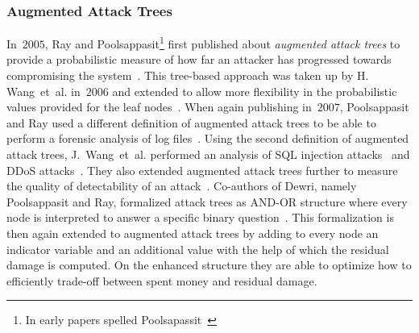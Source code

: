 \documentclass[a4paper]{article}
\begin{document}
\subsubsection{Augmented Attack Trees} 
\label{sec:augmented_attack_trees}

In~$2005$, Ray and Poolsappasit\footnote{In early papers spelled
Poolsapassit~\cite{RaPo,PoRa}} first published about \emph{augmented
attack trees} to provide a probabilistic measure of how far an
attacker has progressed towards compromising the system~\cite{RaPo}. This
tree-based approach was taken up by H. Wang~et~al. in~$2006$ and extended to
allow more flexibility in the probabilistic values provided for the leaf
nodes~\cite{WaLiZh}. When again publishing in~$2007$, Poolsappasit and Ray used
a different definition of augmented attack trees to be able to perform a
forensic analysis of log files~\cite{PoRa}. Using the second definition of
augmented attack trees, J.~Wang~et~al. performed an analysis of SQL injection
attacks~\cite{WaPhWhPa} and DDoS attacks~\cite{WaPhWhPa3}. They also extended
augmented attack trees further to measure the quality of detectability of an
attack~\cite{WaPhWhPa2}. Co-authors of Dewri, namely Poolsappasit and Ray,
formalized attack trees as AND-OR structure where every node is interpreted to
answer a specific binary question~\cite{DePoRaWh,DeRaPoWh}. This
formalization is then again extended to augmented attack trees by adding to
every node an indicator variable and an additional value with the help of
which the residual damage is computed. On the enhanced structure they are able
to optimize how to efficiently trade-off between spent money and residual
damage.
\end{document}
